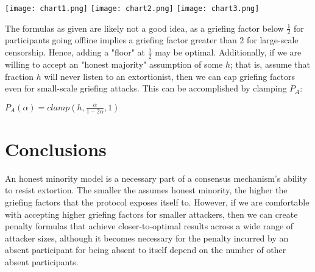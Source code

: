 \documentclass[12pt]{article}
\begin{document}
\texttt{[image: chart1.png]}
\texttt{[image: chart2.png]}
\texttt{[image: chart3.png]}

The formulas as given are likely not a good idea, as a griefing factor below $\frac{1}{2}$ for participants going offline implies a griefing factor greater than 2 for large-scale censorship. Hence, adding a "floor" at $\frac{1}{2}$ may be optimal. Additionally, if we are willing to accept an "honest majority" assumption of some $h$; that is, assume that fraction $h$ will never listen to an extortionist, then we can cap griefing factors even for small-scale griefing attacks. This can be accomplished by clamping $P_A$:

$P_A(\alpha) = clamp(h, \frac{\alpha}{1 - 2\alpha}, 1)$

\section{Conclusions}\label{conclusions}
An honest minority model is a necessary part of a consensus mechanism's ability to resist extortion. The smaller the assumes honest minority, the higher the griefing factors that the protocol exposes itself to. However, if we are comfortable with accepting higher griefing factors for smaller attackers, then we can create penalty formulas that achieve closer-to-optimal results across a wide range of attacker sizes, although it becomes necessary for the penalty incurred by an absent participant for being absent to itself depend on the number of other absent participants.



\end{document}
